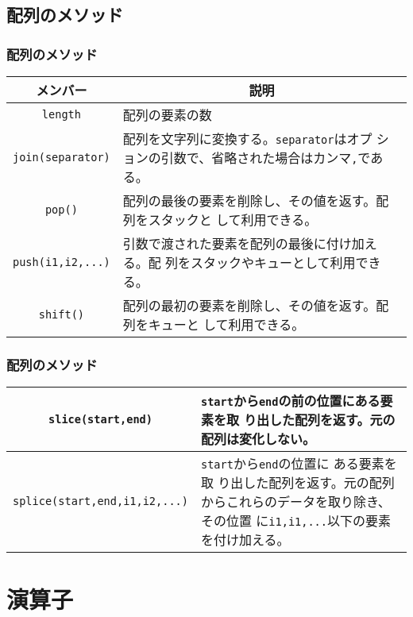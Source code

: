 \subsection{配列のメソッド}
\begin{frame}[containsverbatim]
 \frametitle{配列のメソッド}
\begin{center}
 \begin{tabular}{|c|m{}|}\hline
 メンバー&\multicolumn{1}{c|}{説明} \\\hline
  \Verb+length+ &配列の要素の数\\ \hline
  \Verb+join(separator)+& 配列を文字列に変換する。\Verb+separator+はオプ
      ションの引数で、省略された場合はカンマ\Verb+,+である。\\ \hline
  \Verb+pop()+& 配列の最後の要素を削除し、その値を返す。配列をスタックと
      して利用できる。\\ \hline
  \Verb+push(i1,i2,...)+& 引数で渡された要素を配列の最後に付け加える。配
      列をスタックやキューとして利用できる。\\ \hline
  \Verb+shift()+&配列の最初の要素を削除し、その値を返す。配列をキューと
      して利用できる。\\ \hline
\end{tabular}
\end{center}
\end{frame}
\begin{frame}[containsverbatim]
 \frametitle{配列のメソッド}
\begin{center}
 \begin{tabular}{|c|m{}|}\hline
   \Verb+slice(start,end)+&\Verb+start+から\Verb+end+の前の位置にある要素を取
      り出した配列を返す。元の配列は変化しない。\\ \hline
  \Verb+splice(start,end,i1,i2,...)+&\Verb+start+から\Verb+end+の位置に
      ある要素を取
      り出した配列を返す。元の配列からこれらのデータを取り除き、その位置
      に\Verb+i1,i1,...+以下の要素を付け加える。\\ \hline
\end{tabular}
\end{center}
\end{frame}
\section{演算子}
